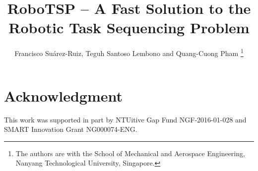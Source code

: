 \documentclass[letterpaper, 10 pt, conference]{ieeeconf}
\title{\LARGE
  \textbf{RoboTSP -- A Fast Solution to the Robotic Task Sequencing Problem}}
\author{Francisco Su\'{a}rez-Ruiz, Teguh Santoso Lembono and Quang-Cuong Pham%
  \thanks{The authors are with the School of Mechanical and Aerospace
          Engineering, Nanyang Technological University, Singapore.}}
\begin{document}
\maketitle
\thispagestyle{empty}
\pagestyle{empty}








\section*{Acknowledgment}
This work was supported in part by NTUitive Gap Fund NGF-2016-01-028
and SMART Innovation Grant NG000074-ENG.




\end{document}
